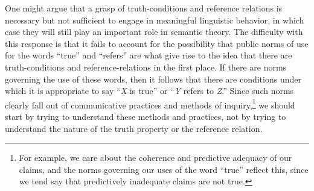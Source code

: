 One might argue that a grasp of truth-conditions and reference relations is necessary but not sufficient to engage in meaningful linguistic behavior, in which case they will still play an important role in semantic theory. The difficulty with this response is that it fails to account for the possibility that public norms of use for the words ``true'' and ``refers'' are what give rise to the idea that there are truth-conditions and reference-relations in the first place. If there are norms governing the use of these words, then it follows that there are conditions under which it is appropriate to say ``\textit{X} is true'' or ``\textit{Y} refers to \textit{Z}.'' Since such norms clearly fall out of communicative practices and methods of inquiry,\footnote{For example, we care about the coherence and predictive adequacy of our claims, and the norms governing our uses of the word ``true'' reflect this, since we tend say that predictively inadequate claims are not true.} we should start by trying to understand these methods and practices, not by trying to understand the nature of the truth property or the reference relation.

